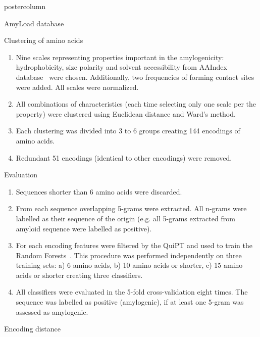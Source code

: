 \documentclass[final]{beamer}\usepackage[]{graphicx}\usepackage[]{color}
\begin{document}
\begin{frame}
\begin{columns}
\begin{column}{.50\textwidth}
\begin{beamercolorbox}[center,wd=\textwidth]{postercolumn}
\begin{minipage}[T]{.95\textwidth}
{\begin{block}{AmyLoad database}
\end{block}
\vfill

\begin{block}{Clustering of amino acids}

\begin{enumerate}[1.]
\item Nine scales representing properties important in the amylogenicity: hydrophobicity, size polarity and solvent accessibility from AAIndex database~\citep{kawashima_aaindex:_2008} were chosen. Additionally, two frequencies of forming contact sites~\citep{wozniak_characteristics_2014} were added. All scales were normalized.
\item All combinations of characteristics (each time selecting only one scale per the property) were clustered using Euclidean distance and Ward's method.
\item Each clustering was divided into 3 to 6 groups creating 144 encodings of amino acids.
\item Redundant 51 encodings (identical to other encodings) were removed.
\end{enumerate}

\end{block}
\vfill

\begin{block}{Evaluation}

\begin{enumerate}[1.]
\item Sequences shorter than 6 amino acids were discarded.
\item From each sequence overlapping 5-grams were extracted. All n-grams were labelled as their sequence of the origin (e.g. all 5-grams extracted from amyloid sequence were labelled as positive).
\item For each encoding features were filtered by the QuiPT and used to train the Random Forests~\citep{liaw_classification_2002}. This procedure was performed independently on three training sets: a) 6 amino acids, b) 10 amino acids or shorter, c) 15 amino acids or shorter creating three classifiers.
\item All classifiers were evaluated in the 5-fold cross-validation eight times. The sequence was labelled as positive (amylogenic), if at least one 5-gram was assessed as amylogenic.
\end{enumerate}

\end{block}
\vfill

\begin{block}{Encoding distance}


\end{block}}
\end{minipage}
\end{beamercolorbox}
\end{column}
\end{columns}
\end{frame}
\end{document}
